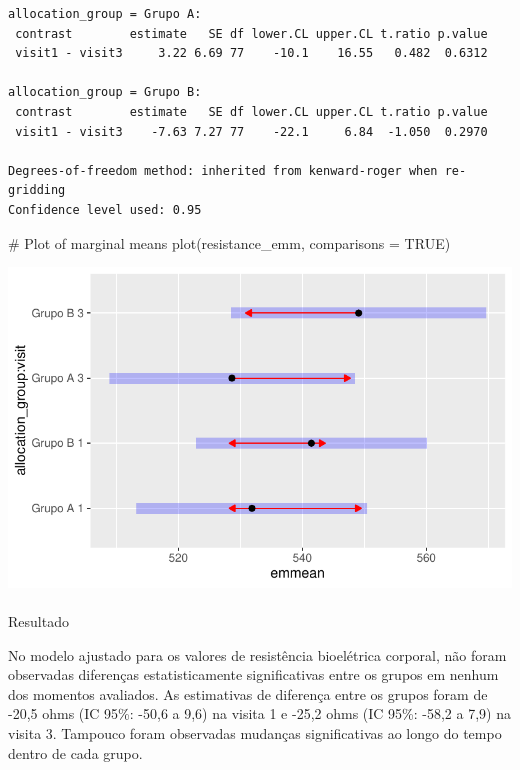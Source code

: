 \documentclass[
  12pt,
]{article}
\makeatletter
\let\oldparagraph\paragraph
\renewcommand{\paragraph}{
    \@ifstar
      \xxxParagraphStar
      \xxxParagraphNoStar
  }
\newcommand{\xxxParagraphStar}[1]{\oldparagraph*{#1}\mbox{}}
\newcommand{\xxxParagraphNoStar}[1]{\oldparagraph{#1}\mbox{}}
\newenvironment{Shaded}{\begin{snugshade}}{\end{snugshade}}
\newcommand{\AttributeTok}[1]{\textcolor[rgb]{0.40,0.45,0.13}{#1}}
\newcommand{\CommentTok}[1]{\textcolor[rgb]{0.37,0.37,0.37}{#1}}
\newcommand{\ConstantTok}[1]{\textcolor[rgb]{0.56,0.35,0.01}{#1}}
\newcommand{\FunctionTok}[1]{\textcolor[rgb]{0.28,0.35,0.67}{#1}}
\newcommand{\NormalTok}[1]{\textcolor[rgb]{0.00,0.23,0.31}{#1}}
\makeatother
\begin{document}
\begin{verbatim}
allocation_group = Grupo A:
 contrast        estimate   SE df lower.CL upper.CL t.ratio p.value
 visit1 - visit3     3.22 6.69 77    -10.1    16.55   0.482  0.6312

allocation_group = Grupo B:
 contrast        estimate   SE df lower.CL upper.CL t.ratio p.value
 visit1 - visit3    -7.63 7.27 77    -22.1     6.84  -1.050  0.2970

Degrees-of-freedom method: inherited from kenward-roger when re-gridding 
Confidence level used: 0.95 
\end{verbatim}

\begin{Shaded}
\begin{Highlighting}[]
\CommentTok{\# Plot of marginal means}
\FunctionTok{plot}\NormalTok{(resistance\_emm, }\AttributeTok{comparisons =} \ConstantTok{TRUE}\NormalTok{)}
\end{Highlighting}
\end{Shaded}

\includegraphics{Outcomes_files/figure-pdf/resistance_sens_emm-1.pdf}

\paragraph{Resultado}\label{resultado-19}

No modelo ajustado para os valores de resistência bioelétrica corporal,
não foram observadas diferenças estatisticamente significativas entre os
grupos em nenhum dos momentos avaliados. As estimativas de diferença
entre os grupos foram de -20,5 ohms (IC 95\%: -50,6 a 9,6) na visita 1 e
-25,2 ohms (IC 95\%: -58,2 a 7,9) na visita 3. Tampouco foram observadas
mudanças significativas ao longo do tempo dentro de cada grupo.
\end{document}
